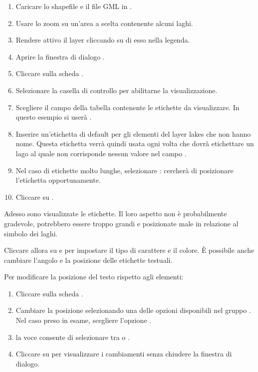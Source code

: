 \begin{enumerate}
\item Caricare lo shapefile  e il file GML  in \qg.
\item Usare lo zoom su un'area a scelta contenente alcuni laghi.
\item Rendere attivo il layer  cliccando su di esso nella
legenda.
\item Aprire la finestra di dialogo .
\item Cliccare sulla scheda .
\item Selezionare la casella di controllo  per
abilitarne la visualizzazione.
\item Scegliere il campo della tabella contenente le etichette da visualizzare. 
  In questo esempio si userà .
\item Inserire un'etichetta di default per gli elementi del layer lakes che
non hanno nome. Questa etichetta verrà quindi usata ogni volta che \qg dovrà
etichettare un lago al quale non corrisponde nessun valore nel campo .
\item Nel caso di etichette molto lunghe, selezionare : 
\qg cercherà di posizionare l'etichetta opportunamente.
\item Cliccare su .
\end{enumerate} 

Adesso sono visualizzate le etichette. Il loro aspetto non è probabilmente
gradevole, potrebbero essere troppo grandi e posizionate male in relazione al
simbolo dei laghi.

Cliccare allora su  e 
per impostare il tipo di carattere e il colore. È possibile anche cambiare
l'angolo e la posizione delle etichette testuali.

Per modificare la posizione del testo rispetto agli elementi:

\begin{enumerate} 
\item Cliccare sulla scheda .
\item Cambiare la posizione selezionando una delle opzioni disponibili nel
gruppo . Nel caso preso in esame, scegliere l'opzione
.
\item la voce  consente di
selezionare tra  o .
\item Cliccare su  per visualizzare i cambiamenti senza chiudere
la finestra di dialogo.
\end{enumerate} 

